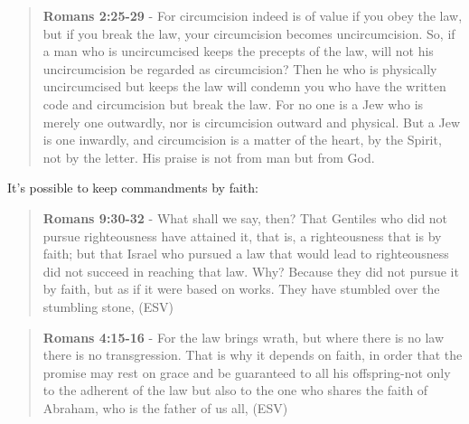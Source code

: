 \documentclass[11pt]{article}
\begin{document}
\begin{quote}
\textbf{Romans 2:25-29} - For circumcision indeed is of value if you obey the law, but if you break the law, your circumcision becomes uncircumcision. So, if a man who is uncircumcised keeps the precepts of the law, will not his uncircumcision be regarded as circumcision? Then he who is physically uncircumcised but keeps the law will condemn you who have the written code and circumcision but break the law. For no one is a Jew who is merely one outwardly, nor is circumcision outward and physical. But a Jew is one inwardly, and circumcision is a matter of the heart, by the Spirit, not by the letter. His praise is not from man but from God.
\end{quote}

It's possible to keep commandments by faith:

\begin{quote}
\textbf{Romans 9:30-32} - What shall we say, then? That Gentiles who did not pursue righteousness have attained it, that is, a righteousness that is by faith; but that Israel who pursued a law that would lead to righteousness did not succeed in reaching that law. Why? Because they did not pursue it by faith, but as if it were based on works. They have stumbled over the stumbling stone, (ESV)
\end{quote}

\begin{quote}
\textbf{Romans 4:15-16} - For the law brings wrath, but where there is no law there is no transgression. That is why it depends on faith, in order that the promise may rest on grace and be guaranteed to all his offspring-not only to the adherent of the law but also to the one who shares the faith of Abraham, who is the father of us all, (ESV)
\end{quote}
\end{document}
